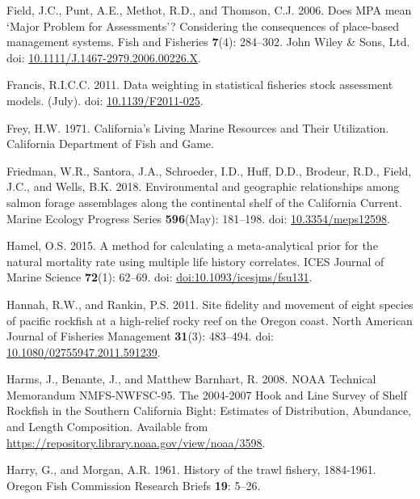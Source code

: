 \documentclass[
  english,
  a4paper,
]{article}
\newlength{\cslhangindent}
\newlength{\cslentryspacingunit} %
\newenvironment{CSLReferences}[2] %
 {%
  \setlength{\parindent}{0pt}
  \ifodd #1
  \let\oldpar\par
  \def\par{\hangindent=\cslhangindent\oldpar}
  \fi
  \setlength{\parskip}{#2\cslentryspacingunit}
 }%
 {}
\begin{document}
\begin{CSLReferences}{1}{0}
\leavevmode{}%
Field, J.C., Punt, A.E., Methot, R.D., and Thomson, C.J. 2006. {Does MPA mean `Major Problem for Assessments'? Considering the consequences of place-based management systems}. Fish and Fisheries \textbf{7}(4): 284--302. John Wiley \& Sons, Ltd. doi: \href{https://doi.org/10.1111/J.1467-2979.2006.00226.X}{10.1111/J.1467-2979.2006.00226.X}.

\leavevmode{}%
Francis, R.I.C.C. 2011. {Data weighting in statistical fisheries stock assessment models}. (July). doi: \href{https://doi.org/10.1139/F2011-025}{10.1139/F2011-025}.

\leavevmode{}%
Frey, H.W. 1971. {California's Living Marine Resources and Their Utilization. California Department of Fish and Game}.

\leavevmode{}%
Friedman, W.R., Santora, J.A., Schroeder, I.D., Huff, D.D., Brodeur, R.D., Field, J.C., and Wells, B.K. 2018. {Environmental and geographic relationships among salmon forage assemblages along the continental shelf of the California Current}. Marine Ecology Progress Series \textbf{596}(May): 181--198. doi: \href{https://doi.org/10.3354/meps12598}{10.3354/meps12598}.

\leavevmode{}%
Hamel, O.S. 2015. {A method for calculating a meta-analytical prior for the natural mortality rate using multiple life history correlates}. ICES Journal of Marine Science \textbf{72}(1): 62--69. doi: \href{https://doi.org/doi:10.1093/icesjms/fsu131}{doi:10.1093/icesjms/fsu131}.

\leavevmode{}%
Hannah, R.W., and Rankin, P.S. 2011. {Site fidelity and movement of eight species of pacific rockfish at a high-relief rocky reef on the Oregon coast}. North American Journal of Fisheries Management \textbf{31}(3): 483--494. doi: \href{https://doi.org/10.1080/02755947.2011.591239}{10.1080/02755947.2011.591239}.

\leavevmode{}%
Harms, J., Benante, J., and Matthew Barnhart, R. 2008. {NOAA Technical Memorandum NMFS-NWFSC-95. The 2004-2007 Hook and Line Survey of Shelf Rockfish in the Southern California Bight: Estimates of Distribution, Abundance, and Length Composition}. Available from \url{https://repository.library.noaa.gov/view/noaa/3598}.

\leavevmode{}%
Harry, G., and Morgan, A.R. 1961. {History of the trawl fishery, 1884-1961}. Oregon Fish Commission Research Briefs \textbf{19}: 5--26.


\end{CSLReferences}
\end{document}
